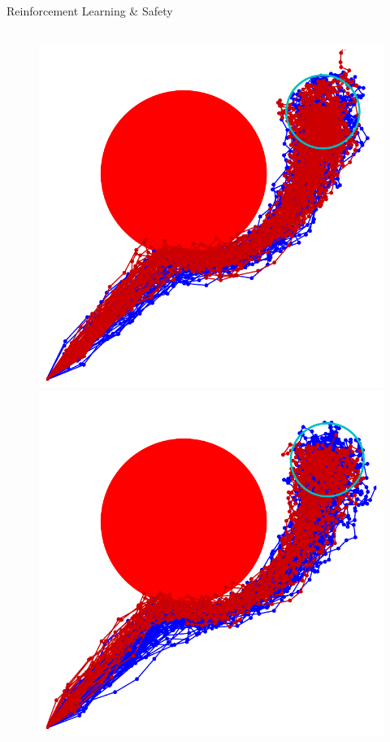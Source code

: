\documentclass[lecture]{beamer}
\begin{document}
\begin{frame}{\normalsize Reinforcement Learning \& Safety}
\begin{columns}
\begin{overlayarea}{\textwidth}{.55\textheight}
\begin{figure}
{	}
	      \only<5>
        {
        \center
	\includegraphics[width=1\textwidth,clip]{Codes/RL/RLSafety2.pdf}
	}
	      \only<6>
        {
        \center
	\includegraphics[width=1\textwidth,clip]{Codes/RL/RLSafety3.pdf}
}
\end{figure}
\end{overlayarea}
\end{columns}
\end{frame}
\end{document}
